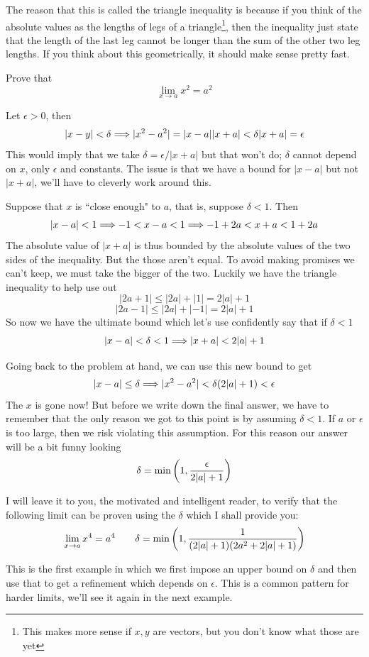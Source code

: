 The reason that this is called the triangle inequality is because if you think of the absolute values as the lengths of legs of a triangle\footnote{This makes more sense if $x, y$ are vectors, but you don't know what those are yet}, then the inequality just state that the length of the last leg cannot be longer than the sum of the other two leg lengths. If you think about this geometrically, it should make sense pretty fast.

\begin{example}
	Prove that
	\[ \lim_{x \to a} x^2 = a^2 \]
	
	Let $\epsilon > 0$, then
	\[ |x - y| < \delta \Longrightarrow |x^2 - a^2| = |x - a||x + a| < \delta |x + a| = \epsilon \]
	This would imply that we take $\delta = \epsilon / |x + a|$ but that won't do; $\delta$ cannot depend on $x$, only $\epsilon$ and constants. The issue is that we have a bound for $|x - a|$ but not $|x + a|$, we'll have to cleverly work around this. 
	
	Suppose that $x$ is ``close enough" to $a$, that is, suppose $\delta < 1$. Then
	\[ |x - a| < 1 \Longrightarrow -1 < x - a < 1 \Longrightarrow -1 + 2a < x + a < 1 + 2a \]
	The absolute value of $|x + a|$ is thus bounded by the absolute values of the two sides of the inequality. But the those aren't equal. To avoid making promises we can't keep, we must take the bigger of the two. Luckily we have the triangle inequality to help use out
	\[ |2a + 1| \leq |2a| + |1| = 2|a| + 1 \]
	\[ |2a - 1| \leq |2a| + |-1| = 2|a| + 1 \]
	So now we have the ultimate bound which let's use confidently say that if $\delta < 1$
	\[ |x - a| < \delta < 1 \Longrightarrow |x + a| < 2|a| + 1 \]
	
	Going back to the problem at hand, we can use this new bound to get
	\[ |x - a| \leq \delta \Longrightarrow |x^2 - a^2| < \delta (2|a| + 1) < \epsilon \]
	The $x$ is gone now! But before we write down the final answer, we have to remember that the only reason we got to this point is by assuming $\delta < 1$. If $a$ or $\epsilon$ is too large, then we risk violating this assumption. For this reason our answer will be a bit funny looking
	\[ \delta = \min\qty(1, \frac{\epsilon}{2|a| + 1}) \]
	
	I will leave it to you, the motivated and intelligent reader, to verify that the following limit can be proven using the $\delta$ which I shall provide you:
	\[ \lim_{x \to a} x^4 = a^4 \qquad \delta = \min\qty(1, \frac{1}{(2|a| + 1)(2a^2 + 2|a| + 1)}) \]
\end{example}

This is the first example in which we first impose an upper bound on $\delta$ and then use that to get a refinement which depends on $\epsilon$. This is a common pattern for harder limits, we'll see it again in the next example.


